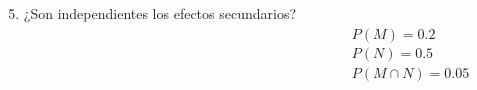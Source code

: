 \documentclass[aspectratio=149,10pt,xcolor=dvipsnames,t]{beamer}
\begin{document}
\begin{frame}
	\begin{columns}
		\begin{column}[T]{0.75\textwidth}
			\begin{enumerate}
  \setcounter{enumi}{4}
				\item ¿Son independientes los efectos secundarios?
			\end{enumerate}
		\end{column}
		\begin{column}[T]{0.25\textwidth}
			\\
			$P(M)=0.2$\\
			$P(N)=0.5$\\
			$P(M\cap N)=0.05$
		\end{column}
	\end{columns}
\end{frame}
\end{document}
